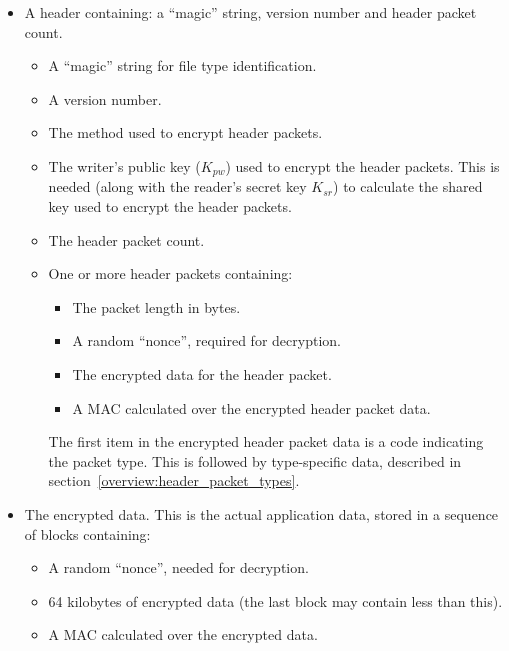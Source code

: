 \documentclass[10pt]{article}
\begin{document}
\begin{itemize}
\item A header containing: a ``magic'' string, version number and header packet count.
\begin{itemize}
\item A ``magic'' string for file type identification.
\item A version number.
\item The method used to encrypt header packets.
\item The writer's public key  ($K_{pw}$) used to encrypt the header packets.
This is needed (along with the reader's secret key $K_{sr}$)
to calculate the shared key used to encrypt the header packets.
\item The header packet count.
\item One or more header packets containing:
\begin{itemize}
\item The packet length in bytes.
\item A random ``nonce'', required for decryption.
\item The encrypted data for the header packet.
\item A MAC calculated over the encrypted header packet data.
\end{itemize}
The first item in the encrypted header packet data is a code indicating the packet type.
This is followed by type-specific data, described in section~\ref{overview:header_packet_types}.
\end{itemize}
\item The encrypted data.
This is the actual application data, stored in a sequence of blocks containing:
\begin{itemize}
\item A random ``nonce'', needed for decryption.
\item 64 kilobytes of encrypted data (the last block may contain less than this).
\item A MAC calculated over the encrypted data.
\end{itemize}
\end{itemize}
\end{document}
